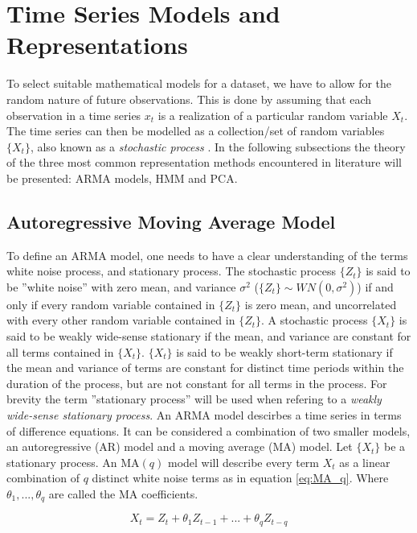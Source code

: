 \section{Time Series Models and Representations} \label{sec:ts_models}
To select suitable mathematical models for a dataset, we have to allow for the random nature of future observations. 
This is done by assuming that each observation in a time series $x_t$ is a realization of a particular random variable $X_t$. 
The time series can then be modelled as a collection/set of random variables $\{X_t\}$, also known as a \textit{stochastic process} \cite{brockwell_davis_advanced}. 
In the following subsections the theory of the three most common representation methods encountered in literature will be presented: ARMA models, HMM and PCA.

\subsection{Autoregressive Moving Average Model} \label{sec:arma_model}
To define an ARMA model, one needs to have a clear understanding of the terms white noise process, and stationary process. 
The stochastic process $\{Z_t\}$ is said to be ''white noise'' with zero mean, and variance $\sigma^2$ ($\{Z_t\} \sim WN(0, \sigma^2)$) if and only if 
every random variable contained in $\{Z_t\}$ is zero mean, and uncorrelated with every other random variable contained in $\{Z_t\}$. 
A stochastic process $\{X_t\}$ is said to be weakly wide-sense stationary if the mean, and variance are constant for all terms contained in $\{X_t\}$. 
$\{X_t\}$ is said to be weakly short-term stationary if the mean and variance of terms are constant for distinct time periods within the duration of the process, but are not constant for all terms in the process. 
For brevity the term ''stationary process'' will be used when refering to a \textit{weakly wide-sense stationary process}. 
An ARMA model descirbes a time series in terms of difference equations. 
It can be considered a combination of two smaller models, an autoregressive (AR) model and a moving average (MA) model. 
Let $\{X_t\}$ be a stationary process. 
An $\mathrm{MA}(q)$ model will describe every term $X_t$ as a linear combination of $q$ distinct white noise terms as in equation \eqref{eq:MA_q}. Where $\theta_1, ... ,\theta_q$ are called the MA coefficients.

\begin{equation}
    X_t = Z_{t} + \theta_1 Z_{t-1} + ... + \theta_q Z_{t-q}
    \label{eq:MA_q}
\end{equation}

